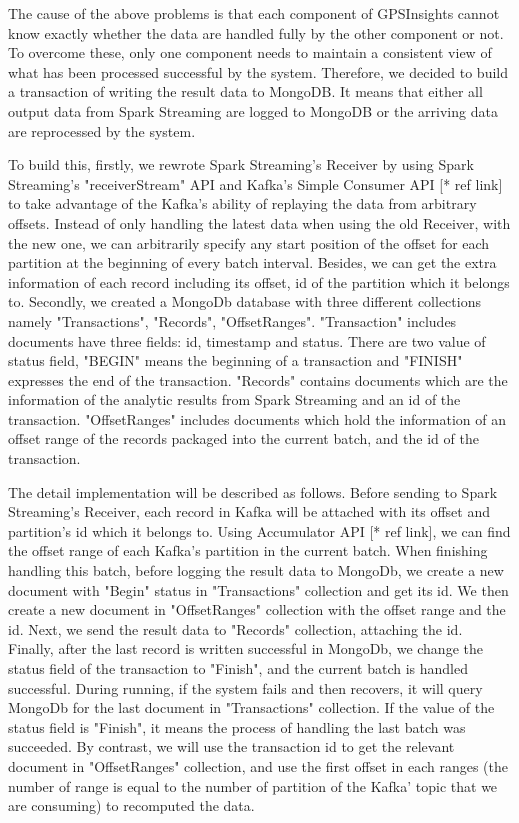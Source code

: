 \documentclass{acm_proc_article-sp}
\begin{document}
The cause of the above problems is that each component of GPSInsights cannot know exactly whether the data are handled fully by the other component or not. To overcome these, only one component needs to maintain a consistent view of what has been processed successful by the system. Therefore, we decided to build a transaction of writing the result data to MongoDB. It means that either all output data from Spark Streaming are logged to MongoDB or the arriving data are reprocessed by the system. 

To build this, firstly, we rewrote Spark Streaming's Receiver by using Spark Streaming's "receiverStream" API and Kafka's Simple Consumer API [* ref link] to take advantage of the Kafka's ability of replaying the data from arbitrary offsets.  Instead of only handling the latest data when using the old Receiver, with the new one, we can arbitrarily specify any start position of the offset for each partition at the beginning of every batch interval. Besides, we can get the extra information of each record including its offset, id of the partition which it belongs to.  Secondly, we created a MongoDb database with three different collections namely "Transactions", "Records", "OffsetRanges". "Transaction" includes documents have three fields: id, timestamp and status. There are two value of status field, "BEGIN" means the beginning of a transaction and "FINISH" expresses the end of the transaction. "Records" contains documents which are the information of the analytic results from Spark Streaming and an id of the transaction. "OffsetRanges" includes documents which hold the information of an offset range of the records packaged into the current batch, and the id of the transaction.

The detail implementation will be described as follows. Before sending to Spark Streaming's Receiver, each record in Kafka will be attached with its offset and partition's id which it belongs to. Using Accumulator API [* ref link], we can find the offset range of each Kafka's partition in the current batch. When finishing handling this batch, before logging the result data to MongoDb, we create a new document with "Begin" status in "Transactions" collection and get its id. We then create a new document in "OffsetRanges" collection with the offset range and the id. Next, we send the result data to "Records" collection, attaching the id. Finally, after the last record is written successful in MongoDb, we change the status field of the transaction to "Finish", and the current batch is handled successful. During running, if the system fails and then recovers, it will query MongoDb for the last document in "Transactions" collection.  If the value of the status field is "Finish", it means the process of handling the last batch was succeeded. By contrast, we will use the transaction id to get the relevant document in "OffsetRanges" collection, and use the first offset in each ranges (the number of range is equal to the number of partition of the Kafka' topic that we are consuming) to recomputed the data. 
\end{document}
